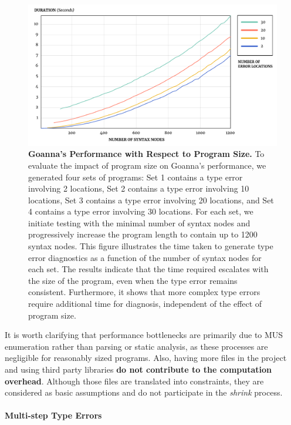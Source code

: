 \documentclass[pdflatex,lineno,sn-nature,Numbered]{sn-jnl}%
\begin{document}
\begin{figure}[ht]
    \centering
    \includegraphics[width=\linewidth]{images/SyntaxNodesDuration}
    \caption{{\bf Goanna's Performance with Respect to Program Size.} To evaluate the impact of program size on Goanna's performance, we generated four sets of programs: Set 1 contains a type error involving 2 locations, Set 2 contains a type error involving 10 locations, Set 3 contains a type error involving 20 locations, and Set 4 contains a type error involving 30 locations. For each set, we initiate testing with the minimal number of syntax nodes and progressively increase the program length to contain up to 1200 syntax nodes. This figure illustrates the time taken to generate type error diagnostics as a function of the number of syntax nodes for each set. The results indicate that the time required escalates with the size of the program, even when the type error remains consistent. Furthermore, it shows that more complex type errors require additional time for diagnosis, independent of the effect of program size.}
    \label{fig:node-size}
\end{figure}

It is worth clarifying that performance bottlenecks are primarily due to MUS enumeration rather than parsing or static analysis, as these processes are negligible for reasonably sized programs. Also, having more files in the project and using third party libraries {\bf do not contribute to the computation overhead}. Although those files are translated into constraints, they are considered as basic assumptions and do not participate in the {\it shrink} process.

\paragraph{Multi-step Type Errors}
\end{document}
